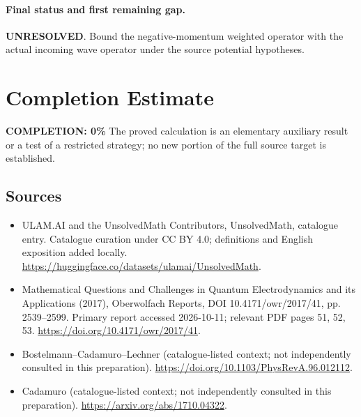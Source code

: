 \documentclass[11pt]{article}
\begin{document}
\paragraph{Final status and first remaining gap.}
\textbf{UNRESOLVED}. Bound the negative-momentum weighted operator with the actual incoming wave operator under the source potential hypotheses.

\section{Completion Estimate}
\noindent\textbf{COMPLETION: 0\%}
The proved calculation is an elementary auxiliary result or a test of a restricted strategy; no new portion of the full source target is established.

\subsection{Sources}
\begin{itemize}
\item[\hypertarget{source:statement:1}{S1}] ULAM.AI and the UnsolvedMath Contributors, UnsolvedMath, catalogue entry. Catalogue curation under CC BY 4.0; definitions and English exposition added locally.
\url{https://huggingface.co/datasets/ulamai/UnsolvedMath}.
\item[\hypertarget{source:statement:2}{S2}] Mathematical Questions and Challenges in Quantum Electrodynamics and its Applications (2017), Oberwolfach Reports, DOI 10.4171/owr/2017/41, pp. 2539--2599. Primary report accessed 2026-10-11; relevant PDF pages 51, 52, 53.
\url{https://doi.org/10.4171/owr/2017/41}.
\item[\hypertarget{source:statement:3}{S3}] Bostelmann--Cadamuro--Lechner (catalogue-listed context; not independently consulted in this preparation).
\url{https://doi.org/10.1103/PhysRevA.96.012112}.
\item[\hypertarget{source:statement:4}{S4}] Cadamuro (catalogue-listed context; not independently consulted in this preparation).
\url{https://arxiv.org/abs/1710.04322}.
\end{itemize}
\label{end:statement}
\end{document}
